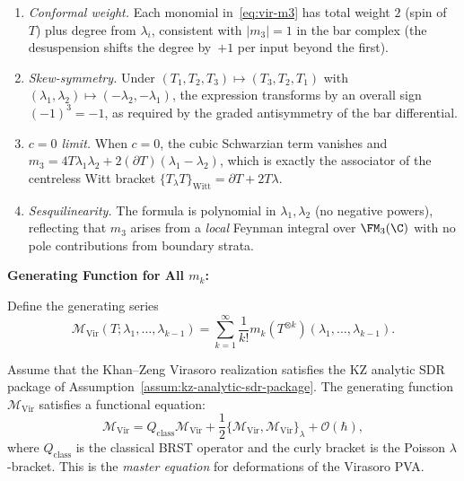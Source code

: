 \begin{remark}
\leavevmode
\begin{enumerate}
\item \emph{Conformal weight.} Each monomial in~\eqref{eq:vir-m3}
 has total weight $2$ (spin of~$T$) plus degree from
 $\lambda_i$, consistent with $|m_3| = 1$ in the bar complex
 (the desuspension shifts the degree by~$+1$ per input beyond the first).
\item \emph{Skew-symmetry.} Under $(T_1,T_2,T_3) \mapsto
 (T_3,T_2,T_1)$ with $(\lambda_1,\lambda_2) \mapsto
 (-\lambda_2,-\lambda_1)$, the expression transforms by an
 overall sign $(-1)^3 = -1$, as required by the graded
 antisymmetry of the bar differential.
\item \emph{$c = 0$ limit.} When $c = 0$, the cubic Schwarzian
 term vanishes and $m_3 = 4T\lambda_1\lambda_2 +
 2(\partial T)(\lambda_1 - \lambda_2)$, which is exactly the
 associator of the centreless Witt bracket
 $\{T_\lambda T\}_{\text{Witt}} = \partial T + 2T\lambda$.
\item \emph{Sesquilinearity.} The formula is polynomial
 in $\lambda_1, \lambda_2$ (no negative powers), reflecting
 that $m_3$ arises from a \emph{local} Feynman integral over
 $\FM_3(\C)$ with no pole contributions from boundary strata.
\end{enumerate}
\end{remark}

\textbf{Generating Function for All $m_k$:}

Define the generating series
\begin{equation}
\mathcal{M}_{\text{Vir}}(T; \lambda_1, \ldots, \lambda_{k-1}) = \sum_{k=1}^\infty \frac{1}{k!} m_k(T^{\otimes k})(\lambda_1, \ldots, \lambda_{k-1}).
\end{equation}

\begin{theorem}
Assume that the Khan--Zeng Virasoro realization satisfies the KZ
analytic SDR package of
Assumption~\textup{\ref{assum:kz-analytic-sdr-package}}.
The generating function $\mathcal{M}_{\text{Vir}}$ satisfies a functional equation:
\begin{equation}
\mathcal{M}_{\text{Vir}} = Q_{\text{class}} \mathcal{M}_{\text{Vir}} + \frac{1}{2} \{\mathcal{M}_{\text{Vir}}, \mathcal{M}_{\text{Vir}}\}_\lambda + \mathcal{O}(\hbar),
\end{equation}
where $Q_{\text{class}}$ is the classical BRST operator and the curly bracket is the Poisson $\lambda$-bracket. This is the \emph{master equation} for deformations of the Virasoro PVA.
\end{theorem}

